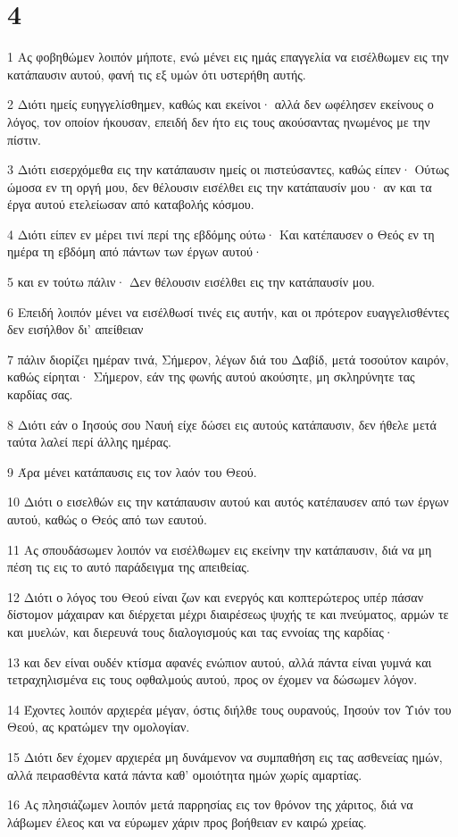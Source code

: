 \chapter{4}

\par 1 Ας φοβηθώμεν λοιπόν μήποτε, ενώ μένει εις ημάς επαγγελία να εισέλθωμεν εις την κατάπαυσιν αυτού, φανή τις εξ υμών ότι υστερήθη αυτής.
\par 2 Διότι ημείς ευηγγελίσθημεν, καθώς και εκείνοι· αλλά δεν ωφέλησεν εκείνους ο λόγος, τον οποίον ήκουσαν, επειδή δεν ήτο εις τους ακούσαντας ηνωμένος με την πίστιν.
\par 3 Διότι εισερχόμεθα εις την κατάπαυσιν ημείς οι πιστεύσαντες, καθώς είπεν· Ούτως ώμοσα εν τη οργή μου, δεν θέλουσιν εισέλθει εις την κατάπαυσίν μου· αν και τα έργα αυτού ετελείωσαν από καταβολής κόσμου.
\par 4 Διότι είπεν εν μέρει τινί περί της εβδόμης ούτω· Και κατέπαυσεν ο Θεός εν τη ημέρα τη εβδόμη από πάντων των έργων αυτού·
\par 5 και εν τούτω πάλιν· Δεν θέλουσιν εισέλθει εις την κατάπαυσίν μου.
\par 6 Επειδή λοιπόν μένει να εισέλθωσί τινές εις αυτήν, και οι πρότερον ευαγγελισθέντες δεν εισήλθον δι' απείθειαν
\par 7 πάλιν διορίζει ημέραν τινά, Σήμερον, λέγων διά του Δαβίδ, μετά τοσούτον καιρόν, καθώς είρηται· Σήμερον, εάν της φωνής αυτού ακούσητε, μη σκληρύνητε τας καρδίας σας.
\par 8 Διότι εάν ο Ιησούς σου Ναυή είχε δώσει εις αυτούς κατάπαυσιν, δεν ήθελε μετά ταύτα λαλεί περί άλλης ημέρας.
\par 9 Άρα μένει κατάπαυσις εις τον λαόν του Θεού.
\par 10 Διότι ο εισελθών εις την κατάπαυσιν αυτού και αυτός κατέπαυσεν από των έργων αυτού, καθώς ο Θεός από των εαυτού.
\par 11 Ας σπουδάσωμεν λοιπόν να εισέλθωμεν εις εκείνην την κατάπαυσιν, διά να μη πέση τις εις το αυτό παράδειγμα της απειθείας.
\par 12 Διότι ο λόγος του Θεού είναι ζων και ενεργός και κοπτερώτερος υπέρ πάσαν δίστομον μάχαιραν και διέρχεται μέχρι διαιρέσεως ψυχής τε και πνεύματος, αρμών τε και μυελών, και διερευνά τους διαλογισμούς και τας εννοίας της καρδίας·
\par 13 και δεν είναι ουδέν κτίσμα αφανές ενώπιον αυτού, αλλά πάντα είναι γυμνά και τετραχηλισμένα εις τους οφθαλμούς αυτού, προς ον έχομεν να δώσωμεν λόγον.
\par 14 Έχοντες λοιπόν αρχιερέα μέγαν, όστις διήλθε τους ουρανούς, Ιησούν τον Υιόν του Θεού, ας κρατώμεν την ομολογίαν.
\par 15 Διότι δεν έχομεν αρχιερέα μη δυνάμενον να συμπαθήση εις τας ασθενείας ημών, αλλά πειρασθέντα κατά πάντα καθ' ομοιότητα ημών χωρίς αμαρτίας.
\par 16 Ας πλησιάζωμεν λοιπόν μετά παρρησίας εις τον θρόνον της χάριτος, διά να λάβωμεν έλεος και να εύρωμεν χάριν προς βοήθειαν εν καιρώ χρείας.


